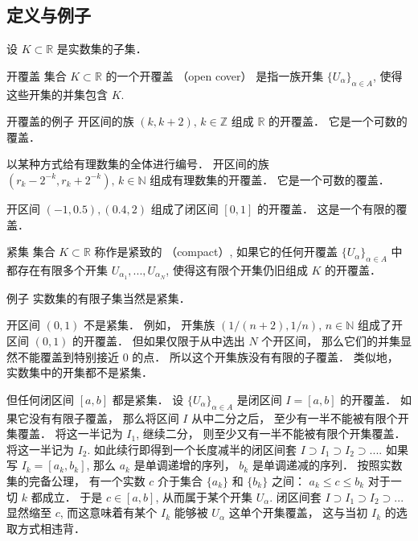 \subsection{定义与例子}
设 $K\subset\mathbb{R}$ 是实数集的子集．
\begin{definition}{开覆盖}
集合 $K\subset\mathbb{R}$ 的一个开覆盖 （open cover） 是指一族开集 $\{U_{\alpha}\}_{\alpha\in A}$, 使得这些开集的并集包含 $K$.
\end{definition}

\begin{example}{开覆盖的例子}
开区间的族 $(k,k+2),\,k\in\mathbb{Z}$ 组成 $\mathbb{R}$ 的开覆盖． 它是一个可数的覆盖．

以某种方式给有理数集的全体进行编号． 开区间的族 $(r_k-2^{-k},r_k+2^{-k}),\,k\in\mathbb{N}$ 组成有理数集的开覆盖． 它是一个可数的覆盖．

开区间 $(-1,0.5),(0.4,2)$ 组成了闭区间 $[0,1]$ 的开覆盖． 这是一个有限的覆盖．
\end{example}

\begin{definition}{紧集}
集合 $K\subset\mathbb{R}$ 称作是紧致的 （compact）, 如果它的任何开覆盖 $\{U_{\alpha}\}_{\alpha\in A}$ 中都存在有限多个开集 $U_{\alpha_1},...,U_{\alpha_N}$, 使得这有限个开集仍旧组成 $K$ 的开覆盖． 
\end{definition}

\begin{example}{例子}
实数集的有限子集当然是紧集．

开区间 $(0,1)$ 不是紧集． 例如， 开集族 $(1/(n+2),1/n),\,n\in\mathbb{N}$ 组成了开区间 $(0,1)$ 的开覆盖． 但如果仅限于从中选出 $N$ 个开区间， 那么它们的并集显然不能覆盖到特别接近 $0$ 的点． 所以这个开集族没有有限的子覆盖． 类似地， 实数集中的开集都不是紧集．

但任何闭区间 $[a,b]$ 都是紧集． 设 $\{U_\alpha\}_{\alpha\in A}$ 是闭区间 $I=[a,b]$ 的开覆盖． 如果它没有有限子覆盖， 那么将区间 $I$ 从中二分之后， 至少有一半不能被有限个开集覆盖． 将这一半记为 $I_1$, 继续二分， 则至少又有一半不能被有限个开集覆盖． 将这一半记为 $I_2$. 如此续行即得到一个长度减半的闭区间套 $I\supset I_1\supset I_2\supset...$. 如果写 $I_k=[a_k,b_k]$, 那么 $a_k$ 是单调递增的序列， $b_k$ 是单调递减的序列． 按照实数集的完备公理， 有一个实数 $c$ 介于集合 $\{a_k\}$ 和 $\{b_k\}$ 之间： $a_k\leq c\leq b_k$ 对于一切 $k$ 都成立． 于是 $c\in[a,b]$, 从而属于某个开集 $U_\alpha$. 闭区间套 $I\supset I_1\supset I_2\supset...$ 显然缩至 $c$, 而这意味着有某个 $I_k$ 能够被 $U_\alpha$ 这单个开集覆盖， 这与当初 $I_k$ 的选取方式相违背．
\end{example}

